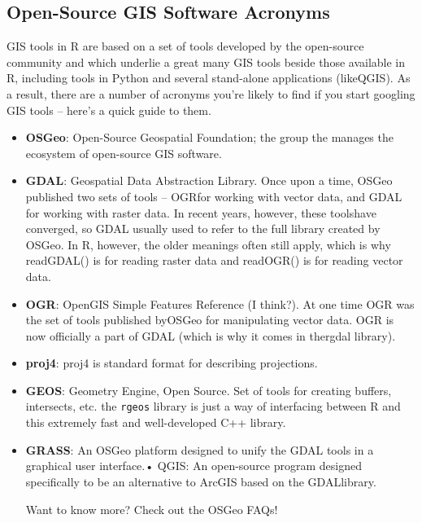 \documentclass[10pt]{article}
\begin{document}
\subsection*{Open-Source GIS Software Acronyms}
GIS tools in R are based on a set of tools developed by the open-source community and which underlie a great many GIS tools beside those available in R, including tools in Python and several stand-alone applications (likeQGIS). As a result, there are a number of acronyms you’re likely to find if you start googling GIS tools – here’s a quick guide to them.
\begin{itemize}
	\item \textbf{OSGeo}: Open-Source Geospatial Foundation; the group the manages the ecosystem of open-source GIS software.
	\item \textbf{GDAL}: Geospatial Data Abstraction Library. Once upon a time, OSGeo published two sets of tools – OGRfor working with vector data, and GDAL for working with raster data. In recent years, however, these toolshave converged, so GDAL usually used to refer to the full library created by OSGeo. In R, however, the older meanings often still apply, which is why readGDAL() is for reading raster data and readOGR() is for reading vector data.
	\item \textbf{OGR}: OpenGIS Simple Features Reference (I think?). At one time OGR was the set of tools published byOSGeo for manipulating vector data. OGR is now officially a part of GDAL (which is why it comes in thergdal library).
	\item \textbf{proj4}: proj4 is standard format for describing projections.
	\item \textbf{GEOS}: Geometry Engine, Open Source. Set of tools for creating buffers, intersects, etc. the \texttt{rgeos} library is just a way of interfacing between R and this extremely fast and well-developed C++ library. 
	\item \textbf{GRASS}: An OSGeo platform designed to unify the GDAL tools in a graphical user interface.• QGIS: An open-source program designed specifically to be an alternative to ArcGIS based on the GDALlibrary.
	
Want to know more? Check out the OSGeo FAQs!

\end{itemize}
\end{document}

